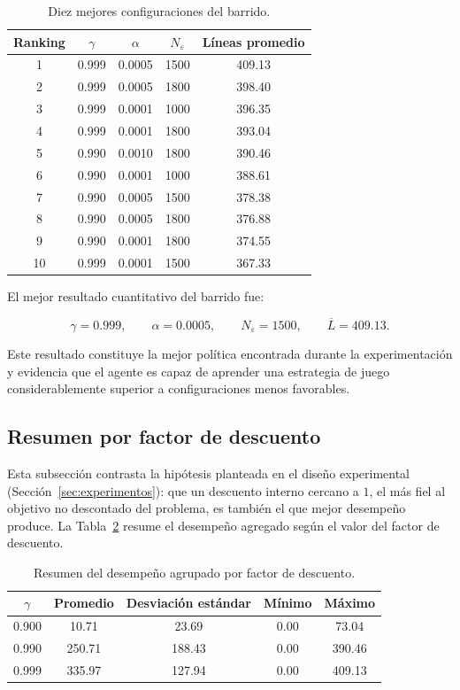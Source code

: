 \begin{table}
\centering
\small
\caption{Diez mejores configuraciones del barrido.}
\label{tab:sweep_top10}
\begin{tabular}{ccccc}
\hline
Ranking & $\gamma$ & $\alpha$ & $N_{\varepsilon}$ & Líneas promedio \\
\hline
1  & 0.999 & 0.0005 & 1500 & 409.13 \\
2  & 0.999 & 0.0005 & 1800 & 398.40 \\
3  & 0.999 & 0.0001 & 1000 & 396.35 \\
4  & 0.999 & 0.0001 & 1800 & 393.04 \\
5  & 0.990 & 0.0010 & 1800 & 390.46 \\
6  & 0.990 & 0.0001 & 1000 & 388.61 \\
7  & 0.990 & 0.0005 & 1500 & 378.38 \\
8  & 0.990 & 0.0005 & 1800 & 376.88 \\
9  & 0.990 & 0.0001 & 1800 & 374.55 \\
10 & 0.999 & 0.0001 & 1500 & 367.33 \\
\hline
\end{tabular}
\end{table}

El mejor resultado cuantitativo del barrido fue:

\begin{equation}
\gamma=0.999,
\qquad
\alpha=0.0005,
\qquad
N_{\varepsilon}=1500,
\qquad
\overline{L}=409.13.
\end{equation}

Este resultado constituye la mejor política encontrada durante la experimentación y evidencia que el agente es capaz de aprender una estrategia de juego considerablemente superior a configuraciones menos favorables.

\subsection{Resumen por factor de descuento}
\label{subsec:res-gamma}

Esta subsección contrasta la hipótesis planteada en el diseño experimental (Sección~\ref{sec:experimentos}): que un descuento interno cercano a $1$, el más fiel al objetivo no descontado del problema, es también el que mejor desempeño produce. La Tabla~\ref{tab:sweep_gamma} resume el desempeño agregado según el valor del factor de descuento.

\begin{table}
\centering
\small
\caption{Resumen del desempeño agrupado por factor de descuento.}
\label{tab:sweep_gamma}
\begin{tabular}{ccccc}
\hline
$\gamma$ & Promedio & Desviación estándar & Mínimo & Máximo \\
\hline
0.900 & 10.71  & 23.69  & 0.00 & 73.04  \\
0.990 & 250.71 & 188.43 & 0.00 & 390.46 \\
0.999 & 335.97 & 127.94 & 0.00 & 409.13 \\
\hline
\end{tabular}
\end{table}

